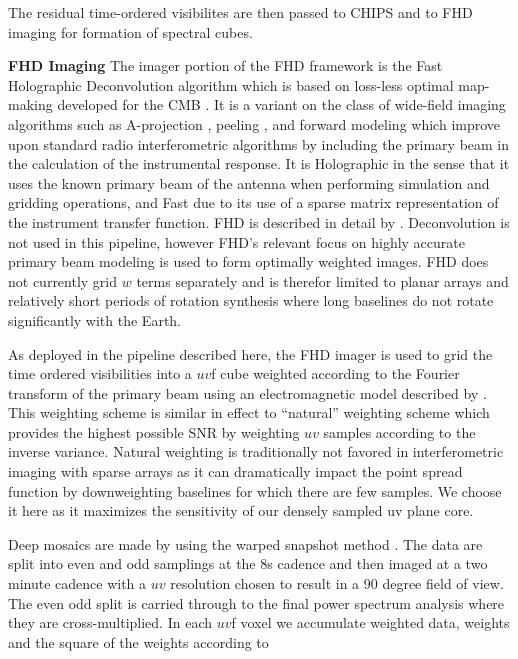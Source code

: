 \documentclass[twolcolumn,iop]{emulateapj}
\begin{document}
The residual time-ordered visibilites are then passed to CHIPS and to FHD imaging for formation of spectral cubes.  %


{\bf FHD Imaging}
\label{sec:FHD_imaging}
The imager portion of the FHD framework is the Fast Holographic Deconvolution algorithm which is based on loss-less optimal map-making developed for the CMB \cite{1997ApJ...480L..87T}. It is a variant on the class of wide-field imaging algorithms such as  A-projection \citep{Bhatnagar..2013ApJ}, peeling \citep{Mitchell:2008p707}, and forward modeling \citep{Pindor:2011p10350,Bernardi:2011p9205} which improve upon standard radio interferometric algorithms by including the primary beam in the calculation of the instrumental response.  It is Holographic in the sense that it uses the known primary beam of the antenna when performing simulation and gridding operations, and Fast due to its use of a sparse matrix representation of the instrument transfer function.  
FHD is described in detail by \cite{Sullivan:2012p9457}.  Deconvolution is not used in this pipeline, however FHD's relevant focus on highly accurate primary beam modeling is used to form optimally weighted images. FHD does not currently grid $w$ terms separately and is therefor limited to planar arrays and relatively short periods of rotation synthesis where long baselines do not rotate significantly with the Earth.

As deployed in the pipeline described here, the FHD imager is used to grid the time ordered visibilities into a $uv$f cube weighted according to the Fourier transform of the primary beam using an electromagnetic model described by \cite{Sutinjo:2015RaSc...50...52S}. This weighting scheme is similar in effect to ``natural'' weighting scheme which provides the highest possible SNR by weighting $uv$ samples according to the inverse variance. Natural weighting is traditionally not favored in interferometric imaging with sparse arrays as it can dramatically impact the point spread function by downweighting baselines for which there are few samples.  We choose it here as it maximizes the sensitivity of our densely sampled uv plane core. 

Deep mosaics are made by using the warped snapshot method \citep{2012SPIE.8500E..0LC}.  The data are split into even and odd samplings at the 8s cadence and then imaged at a two minute cadence with a $uv$ resolution chosen to result in a 90 degree field of view.  The even odd split is carried through to the final power spectrum analysis where they are cross-multiplied.  In each $uv$f voxel we accumulate weighted data, weights and the square of the weights according to 
\end{document}
